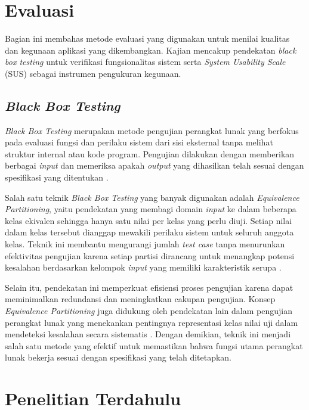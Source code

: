 \section{Evaluasi}

Bagian ini membahas metode evaluasi yang digunakan untuk menilai kualitas dan kegunaan aplikasi yang dikembangkan. Kajian mencakup pendekatan \textit{black box testing} untuk verifikasi fungsionalitas sistem serta \textit{System Usability Scale} (SUS) sebagai instrumen pengukuran kegunaan.

\subsection{\textit{Black Box Testing}}

\textit{Black Box Testing} merupakan metode pengujian perangkat lunak yang berfokus pada evaluasi fungsi dan perilaku sistem dari sisi eksternal tanpa melihat struktur internal atau kode program. Pengujian dilakukan dengan memberikan berbagai \textit{input} dan memeriksa apakah \textit{output} yang dihasilkan telah sesuai dengan spesifikasi yang ditentukan \cite{Pressman2015SWE}.

Salah satu teknik \textit{Black Box Testing} yang banyak digunakan adalah \textit{Equivalence Partitioning}, yaitu pendekatan yang membagi domain \textit{input} ke dalam beberapa kelas ekivalen sehingga hanya satu nilai per kelas yang perlu diuji. Setiap nilai dalam kelas tersebut dianggap mewakili perilaku sistem untuk seluruh anggota kelas. Teknik ini membantu mengurangi jumlah \textit{test case} tanpa menurunkan efektivitas pengujian karena setiap partisi dirancang untuk menangkap potensi kesalahan berdasarkan kelompok \textit{input} yang memiliki karakteristik serupa \cite{Pressman2015SWE}.

Selain itu, pendekatan ini memperkuat efisiensi proses pengujian karena dapat meminimalkan redundansi dan meningkatkan cakupan pengujian. Konsep \textit{Equivalence Partitioning} juga didukung oleh pendekatan lain dalam pengujian perangkat lunak yang menekankan pentingnya representasi kelas nilai uji dalam mendeteksi kesalahan secara sistematis \cite{Myers2011ArtOfSoftwareTesting}. Dengan demikian, teknik ini menjadi salah satu metode yang efektif untuk memastikan bahwa fungsi utama perangkat lunak bekerja sesuai dengan spesifikasi yang telah ditetapkan.


\section{Penelitian Terdahulu}


